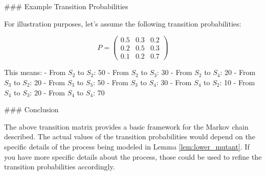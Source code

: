 ### Example Transition Probabilities

For illustration purposes, let's assume the following transition probabilities:

\[
P = \begin{pmatrix}
0.5 & 0.3 & 0.2 \\
0.2 & 0.5 & 0.3 \\
0.1 & 0.2 & 0.7
\end{pmatrix}
\]

This means:
- From \( S_2 \) to \( S_2 \): 50%
- From \( S_2 \) to \( S_3 \): 30%
- From \( S_2 \) to \( S_4 \): 20%
- From \( S_3 \) to \( S_2 \): 20%
- From \( S_3 \) to \( S_3 \): 50%
- From \( S_3 \) to \( S_4 \): 30%
- From \( S_4 \) to \( S_2 \): 10%
- From \( S_4 \) to \( S_3 \): 20%
- From \( S_4 \) to \( S_4 \): 70%

### Conclusion

The above transition matrix provides a basic framework for the Markov chain described. The actual values of the transition probabilities would depend on the specific details of the process being modeled in Lemma \ref{lem:lower_mutant}. If you have more specific details about the process, those could be used to refine the transition probabilities accordingly.